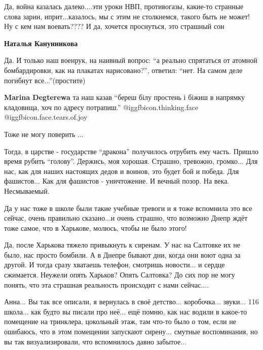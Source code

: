 \begin{itemize}

Да, война казалась далеко....эти уроки НВП, противогазы, какие-то странные
слова зарин, иприт...казалось, мы с этим не столкнемся, такого быть не может!
Ну с кем нам воевать???? И да, хочется проснуться, это страшный сон

\begin{itemize} %
\textbf{Наталья Канунникова} 

Да. И только наш военрук, на наивный вопрос: \enquote{а реально спрятаться от атомной
бомбардировки, как на плакатах нарисовано?}, ответил: \enquote{нет. На самом деле
погибнут все...}(простите)

\textbf{Marina Degterewa} та наш казав \enquote{береш білу простень і біжиш в напрямку кладовища, хоч по адресу потрапиш.}  @igg{fbicon.thinking.face}  @igg{fbicon.face.tears.of.joy} 
\end{itemize} %

Тоже не могу поверить ...


\obeycr
Тогда, в царстве - государстве \enquote{дракона} получилось отрубить ему часть.
Пришло время рубить \enquote{голову}.
Держись, моя хорошая.
Страшно, тревожно, громко...
Для нас, как для наших настоящих дедов и воинов, это будет бой и победа.
Для фашистов... Как для фашистов - уничтожение.
И вечный позор. На века. Несмываемый.
\restorecr


Да у нас тоже в школе были такие учебные тревоги и я тоже вспомнила это все
сейчас, очень правильно сказано...и очень страшно, что возможно Днепр ждёт тоже
самое, что в Харькове, молюсь, чтобы не было этого!


Да, после Харькова тяжело привыкнуть к сиренам. У нас на Салтовке их не было,
нас просто бомбили. А в Днепре бывают дни, когда они воют одна за другой. И
тогда сразу хватаешь телефон, смотришь новости... и сердце сжимается. Неужели
опять Харьков? Опять Салтовка? До сих пор не могу понять, что эта страшная
реальность происходит с нами сейчас....


Анна... Вы так все описали, я вернулась в своё детство... коробочка... звуки... 116
школа... как будто вы писали про неё... ещё помню, как нас водили в какое-то
помещение на тринклера, цокольный этаж, там что-то было о том, если не
ошибаюсь, что в этом помещении запускают сирену... смутные воспоминания, но вы
так визуализировали, что вспомнилось давно забытое...


\end{itemize}
